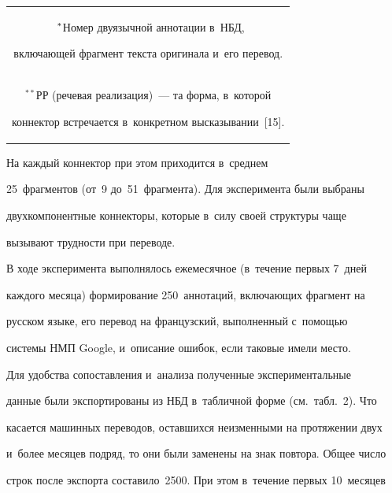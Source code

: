 \begin{table}
\begin{center}
\begin{tabular}{|c|c|c|l|l|}
\hline


\multicolumn{5}{p{360pt}}{\footnotesize \hspace*{2mm}$\hphantom{^*}^*$Номер двуязычной аннотации в~НБД, 


включающей фрагмент текста оригинала и~его перевод.}\\


\multicolumn{5}{p{360pt}}{\footnotesize \hspace*{2mm}$^{**}$РР (речевая реализация)~--- та форма, в~которой 


коннектор встречается в~конкретном высказывании~[15].}


\end{tabular}


\end{center}


\vspace*{-12pt}


\end{table}


На каждый коннектор при этом приходится в~среднем 


25~фрагментов (от~9 до~51~фрагмента). Для эксперимента были выбраны 


двухкомпонентные коннекторы, которые в~силу своей структуры чаще 


вызывают трудности при переводе. 








  В ходе эксперимента выполнялось ежемесячное (в~течение первых 7~дней 


каж\-до\-го месяца) формирование 250~аннотаций, включающих фрагмент на 


русском языке, его перевод на французский, выполненный с~помощью 


системы НМП Google, и~описание ошибок, если таковые имели место.


  


  Для удобства сопоставления и~анализа полученные экспериментальные 


данные были экспортированы из НБД в~табличной форме (см.\ табл.~2). Что 


касается машинных переводов, оставшихся неизменными на протяжении двух 


и~более месяцев подряд, то они были заменены на знак повтора. Общее число 


строк после экспорта составило~2500. При этом в~течение первых 10~месяцев 


